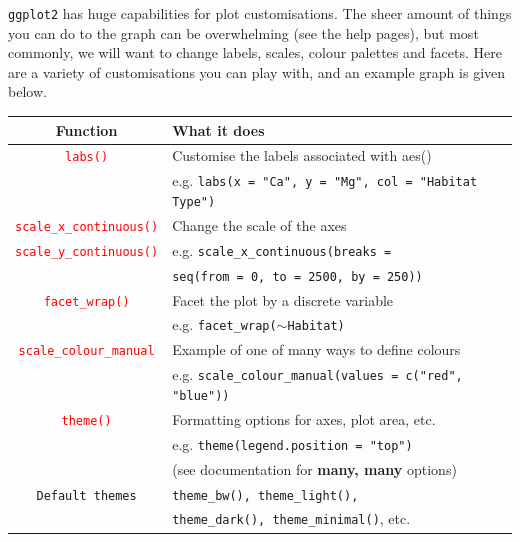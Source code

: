 \documentclass[a4paper,12pt]{article}
\newcommand\code[1]{\textcolor{red}{\texttt{#1}}}
\begin{document}
\texttt{ggplot2} has huge capabilities for plot customisations. The sheer amount of things you can do to the graph can be overwhelming (see the help pages), but most commonly, we will want to change labels, scales, colour palettes and facets. Here are a variety of customisations you can play with, and an example graph is given below.
\pagebreak

\begin{table}[h]
	\centering
	\begin{tabular}{cl}
		
		Function & What it does \\ \hline
		\code{labs()} & Customise the labels associated with aes() \\
		              & e.g. \texttt{labs(x = "Ca", y = "Mg", col = "Habitat Type")} \\ \hline
		\code{scale\_x\_continuous()} & Change the scale of the axes \\
		\code{scale\_y\_continuous()} & e.g. \texttt{scale\_x\_continuous(breaks =} \\
		                              & \hspace*{1cm}\texttt{seq(from = 0, to = 2500, by = 250))} \\ \hline
		\code{facet\_wrap()} & Facet the plot by a discrete variable \\
		                  & e.g. \texttt{facet\_wrap($\sim$Habitat)} \\  \hline
		\code{scale\_colour\_manual} & Example of one of many ways to define colours \\
		                           & e.g. \texttt{scale\_colour\_manual(values = c("red", "blue"))} \\ \hline
		\code{theme()} & Formatting options for axes, plot area, etc. \\
		               & e.g. \texttt{theme(legend.position = "top")} \\
		               & (see documentation for \textbf{many, many} options) \\ \hline
		\texttt{Default themes} & \texttt{theme\_bw(), theme\_light(),} \\
		                        & \texttt{theme\_dark(), theme\_minimal()}, etc. \\
		\hline
		
	\end{tabular}
	 
	\label{tbl:ggplot_customisations}
\end{table}
\end{document}
